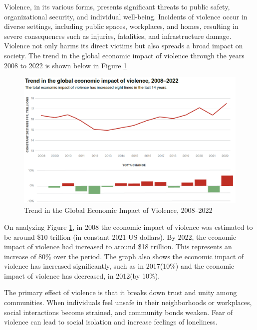 
\noindent Violence, in its various forms, presents significant threats to public safety, organizational security, and individual well-being. Incidents of violence occur in diverse settings, including public spaces, workplaces, and homes, resulting in severe consequences such as injuries, fatalities, and infrastructure damage. Violence not only harms its direct victims but also spreads a broad impact on society. The trend in the global economic impact of violence through the years 2008 to 2022 is shown below in Figure \ref{fig:gpi2}

\begin{figure}[htbp!]
    \centering
    \includegraphics[width=1\linewidth]{Images/gpi 2.png}
    \caption{Trend in the Global Economic Impact of Violence, 2008–2022}
    \label{fig:gpi2}
\end{figure}

\noindent On analyzing Figure \ref{fig:gpi2}, in 2008 the economic impact of violence was estimated to be around \$10 trillion (in constant 2021 US dollars). By 2022, the economic impact of violence had increased to around \$18 trillion. This represents an increase of 80\% over the period. The graph also shows the economic impact of violence has increased significantly, such as in 2017(10\%) and the economic impact of violence has decreased, in 2012(by 10\%).

\noindent The primary effect of violence is that it breaks down trust and unity among communities. When individuals feel unsafe in their neighborhoods or workplaces, social interactions become strained, and community bonds weaken. Fear of violence can lead to social isolation and increase feelings of loneliness.

